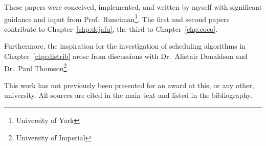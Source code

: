 These papers were conceived, implemented, and written by myself with significant guidance and input
from Prof.~Runciman\footnote{University of York}.  The first and second papers contribute to
Chapter~\ref{chp:dejafu}, the third to Chapter~\ref{chp:coco}.

Furthermore, the inspiration for the investigation of scheduling algorithms in
Chapter~\ref{chp:distrib} arose from discussions with Dr.~Alistair Donaldson and Dr.~Paul
Thomson\footnote{University of Imperial}.

This work has not previously been presented for an award at this, or any other, university.  All
sources are cited in the main text and listed in the bibliography.
